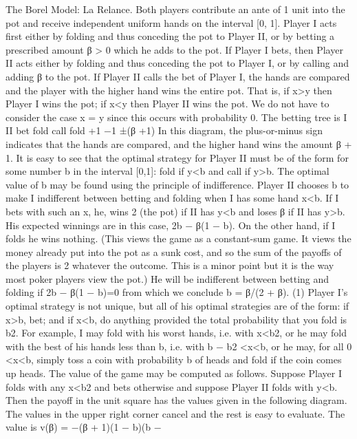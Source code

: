 \documentclass[]{report}
\begin{document}
The Borel Model: La Relance. Both players contribute an ante of 1 unit into the
pot and receive independent uniform hands on the interval [0, 1]. Player I acts first either
by folding and thus conceding the pot to Player II, or by betting a prescribed amount
β > 0 which he adds to the pot. If Player I bets, then Player II acts either by folding and
thus conceding the pot to Player I, or by calling and adding β to the pot. If Player II calls
the bet of Player I, the hands are compared and the player with the higher hand wins the
entire pot. That is, if x>y then Player I wins the pot; if x<y then Player II wins the
pot. We do not have to consider the case x = y since this occurs with probability 0.
The betting tree is
I
II
bet fold
call fold
+1
−1
±(β +1)
In this diagram, the plus-or-minus sign indicates that the hands are compared, and
the higher hand wins the amount β + 1.
It is easy to see that the optimal strategy for Player II must be of the form for some
number b in the interval [0,1]: fold if y<b and call if y>b. The optimal value of b may be
found using the principle of indifference. Player II chooses b to make I indifferent between
betting and folding when I has some hand x<b. If I bets with such an x, he, wins 2 (the
pot) if II has y<b and loses β if II has y>b. His expected winnings are in this case,
2b − β(1 − b). On the other hand, if I folds he wins nothing. (This views the game as a
constant-sum game. It views the money already put into the pot as a sunk cost, and so
the sum of the payoffs of the players is 2 whatever the outcome. This is a minor point but
it is the way most poker players view the pot.) He will be indifferent between betting and
folding if
2b − β(1 − b)=0
from which we conclude
b = β/(2 + β). (1)
Player I’s optimal strategy is not unique, but all of his optimal strategies are of the
form: if x>b, bet; and if x<b, do anything provided the total probability that you fold
is b2. For example, I may fold with his worst hands, i.e. with x<b2, or he may fold with
the best of his hands less than b, i.e. with b − b2 <x<b, or he may, for all 0 <x<b,
simply toss a coin with probability b of heads and fold if the coin comes up heads.
The value of the game may be computed as follows. Suppose Player I folds with any
x<b2 and bets otherwise and suppose Player II folds with y<b. Then the payoff in the
unit square has the values given in the following diagram. The values in the upper right
corner cancel and the rest is easy to evaluate. The value is v(β) = −(β + 1)(1 − b)(b −
\end{document}
